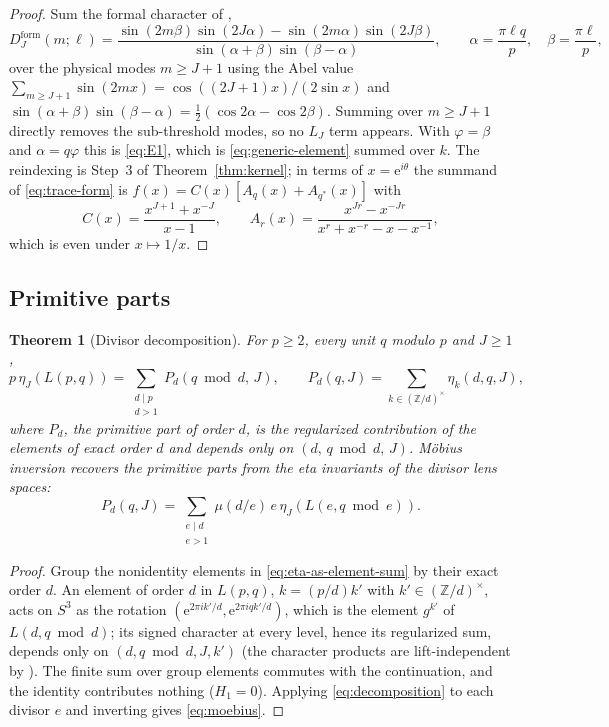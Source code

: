 \documentclass[11pt]{article}
\newtheorem{theorem}{Theorem}[section]
\theoremstyle{definition}
\newcommand{\Z}{\mathbb Z}
\newcommand{\e}{\mathrm e}
\begin{document}
\begin{proof}
Sum the formal character of
\cite[Sec.~5.1]{MahmoodP1Collection2026},
\[
 D^{\mathrm{form}}_J(m;\ell)=\frac{\sin(2m\beta)\sin(2J\alpha)-\sin(2m\alpha)\sin(2J\beta)}
 {\sin(\alpha+\beta)\sin(\beta-\alpha)},\qquad
 \alpha=\frac{\pi\ell q}p,\quad\beta=\frac{\pi\ell}p,
\]
over the physical modes $m\geq J+1$ using the Abel
value $\sum_{m\geq J+1}\sin(2mx)=\cos((2J+1)x)/(2\sin x)$ and
$\sin(\alpha+\beta)\sin(\beta-\alpha)=\tfrac12(\cos2\alpha-\cos2\beta)$.
Summing over $m\geq J+1$ directly removes the sub-threshold modes, so no
$L_J$ term appears.  With $\varphi=\beta$ and $\alpha=q\varphi$ this is
\eqref{eq:E1}, which is \eqref{eq:generic-element} summed over $k$.  The
reindexing is Step~3 of Theorem~\ref{thm:kernel}; in terms of
$x=\e^{i\theta}$ the summand of \eqref{eq:trace-form} is
$f(x)=C(x)[A_q(x)+A_{q^*}(x)]$ with
\begin{equation}
 C(x)=\frac{x^{J+1}+x^{-J}}{x-1},\qquad
 A_r(x)=\frac{x^{Jr}-x^{-Jr}}{x^r+x^{-r}-x-x^{-1}},
 \label{eq:C-A}
\end{equation}
which is even under $x\mapsto1/x$.
\end{proof}

\subsection{Primitive parts}

\begin{theorem}[Divisor decomposition]
\label{thm:decomposition}
For $p\geq2$, every unit $q$ modulo $p$ and $J\geq1$,
\begin{equation}
 p\,\eta_J(L(p,q))=\sum_{\substack{d\mid p\\ d>1}}P_d(q\bmod d,\,J),
 \qquad
 P_d(q,J)=\sum_{k\in(\Z/d)^\times}\eta_k(d,q,J),
 \label{eq:decomposition}
\end{equation}
where $P_d$, the \emph{primitive part} of order $d$, is the regularized
contribution of the elements of exact order $d$ and depends only on
$(d,\,q\bmod d,\,J)$.  M\"obius inversion recovers the primitive parts
from the eta invariants of the divisor lens spaces:
\begin{equation}
 P_d(q,J)=\sum_{\substack{e\mid d\\ e>1}}\mu(d/e)\,e\,\eta_J(L(e,q\bmod e)).
 \label{eq:moebius}
\end{equation}
\end{theorem}

\begin{proof}
Group the nonidentity elements in \eqref{eq:eta-as-element-sum} by their
exact order $d$.  An element of order $d$ in $L(p,q)$, $k=(p/d)k'$ with
$k'\in(\Z/d)^\times$, acts on $S^3$ as the rotation
$(\e^{2\pi ik'/d},\e^{2\pi iqk'/d})$, which is the element $g^{k'}$ of
$L(d,q\bmod d)$; its signed character at every level, hence its
regularized sum, depends only on $(d,q\bmod d,J,k')$ (the character
products are lift-independent by \cite[Lem.~5.2]{MahmoodP1Collection2026}).
The finite sum over group elements commutes with the continuation, and
the identity contributes nothing ($H_1=0$).  Applying
\eqref{eq:decomposition} to each divisor $e$ and inverting gives
\eqref{eq:moebius}.
\end{proof}
\end{document}
